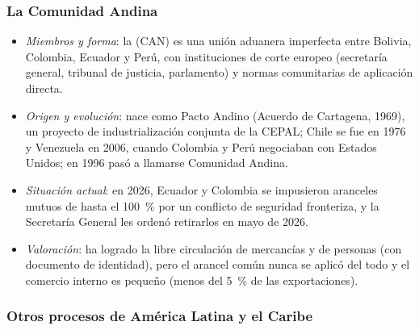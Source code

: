 \documentclass[11pt]{article}
\begin{document}
\subsubsection{La Comunidad Andina}\label{sec:can}

\begin{itemize}
\item \emph{Miembros y forma}: la  (CAN) es una unión aduanera imperfecta entre Bolivia, Colombia, Ecuador y Perú, con instituciones de corte europeo (secretaría general, tribunal de justicia, parlamento) y normas comunitarias de aplicación directa.
\item \emph{Origen y evolución}: nace como Pacto Andino (Acuerdo de Cartagena, 1969), un proyecto de industrialización conjunta de la CEPAL; Chile se fue en 1976 y Venezuela en 2006, cuando Colombia y Perú negociaban con Estados Unidos; en 1996 pasó a llamarse Comunidad Andina.
\item \emph{Situación actual}: en 2026, Ecuador y Colombia se impusieron aranceles mutuos de hasta el 100~\% por un conflicto de seguridad fronteriza, y la Secretaría General les ordenó retirarlos en mayo de 2026\nocite{Forbes2026CAN}.
\item \emph{Valoración}: ha logrado la libre circulación de mercancías y de personas (con documento de identidad), pero el arancel común nunca se aplicó del todo y el comercio interno es pequeño (menos del 5~\% de las exportaciones).
\end{itemize}

\subsubsection{Otros procesos de América Latina y el Caribe}\label{sec:otros-america}
\end{document}
